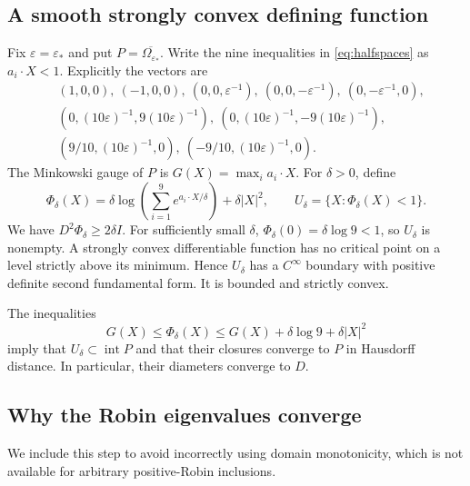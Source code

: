 \documentclass[11pt,a4paper]{article}
\theoremstyle{remark}
\newcommand{\eps}{\varepsilon}
\begin{document}
\subsection{A smooth strongly convex defining function}
Fix $\eps=\eps_*$ and put $P=\overline{\Omega_{\eps_*}}$. Write the nine inequalities in \eqref{eq:halfspaces} as $a_i\cdot X<1$. Explicitly the vectors are
\begin{align*}
 &(1,0,0),\ (-1,0,0),\ (0,0,\eps^{-1}),\ (0,0,-\eps^{-1}),\ (0,-\eps^{-1},0),\\
 &(0,(10\eps)^{-1},9(10\eps)^{-1}),\
 (0,(10\eps)^{-1},-9(10\eps)^{-1}),\\
 &(9/10,(10\eps)^{-1},0),\ (-9/10,(10\eps)^{-1},0).
\end{align*}
The Minkowski gauge of $P$ is $G(X)=\max_i a_i\cdot X$. For $\delta>0$, define
\begin{equation}\label{eq:smoothing}
 \Phi_\delta(X)=\delta\log\left(\sum_{i=1}^9
 e^{a_i\cdot X/\delta}\right)+\delta|X|^2,
 \qquad U_\delta=\{X:\Phi_\delta(X)<1\}.
\end{equation}
We have $D^2\Phi_\delta\ge2\delta I$. For sufficiently small $\delta$, $\Phi_\delta(0)=\delta\log9<1$, so $U_\delta$ is nonempty. A strongly convex differentiable function has no critical point on a level strictly above its minimum. Hence $U_\delta$ has a $C^\infty$ boundary with positive definite second fundamental form. It is bounded and strictly convex.

The inequalities
\[
 G(X)\le\Phi_\delta(X)\le G(X)+\delta\log9+\delta|X|^2
\]
imply that $U_\delta\subset\operatorname{int}P$ and that their closures converge to $P$ in Hausdorff distance. In particular, their diameters converge to $D$.

\subsection{Why the Robin eigenvalues converge}
We include this step to avoid incorrectly using domain monotonicity, which is not available for arbitrary positive-Robin inclusions.
\end{document}
